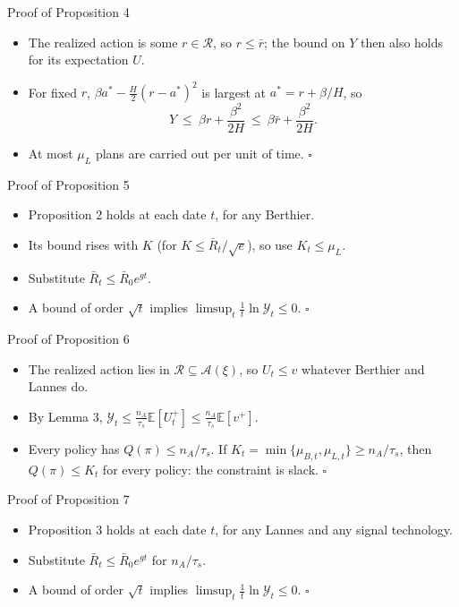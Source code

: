 \documentclass[aspectratio=169,11pt,t]{beamer}
\newcommand{\Lan}{\textcolor{lan}{Lannes}}
\newcommand{\E}{\mathbb{E}}
\newcommand{\Ycal}{\mathcal{Y}}
\begin{document}
\begin{frame}{Proof of Proposition 4}
  \begin{itemize}\setlength{\itemsep}{8pt}
    \item The realized action is some $r\in\mathcal{R}$, so $r\le\bar r$; the bound on $Y$ then also holds for its expectation $U$.
    \item For fixed $r$, $\beta a^*-\tfrac H2(r-a^*)^2$ is largest at $a^*=r+\beta/H$, so
    \[Y\ \le\ \beta r+\frac{\beta^2}{2H}\ \le\ \beta\bar r+\frac{\beta^2}{2H}.\]
    \item At most $\mu_L$ plans are carried out per unit of time. \hfill$\square$
  \end{itemize}
\end{frame}

\begin{frame}{Proof of Proposition 5}
  \begin{itemize}\setlength{\itemsep}{8pt}
    \item Proposition 2 holds at each date $t$, for any Berthier.
    \item Its bound rises with $K$ (for $K\le\bar R_t/\sqrt e$), so use $K_t\le\mu_L$.
    \item Substitute $\bar R_t\le\bar R_0e^{gt}$.
    \item A bound of order $\sqrt t$ implies $\limsup_t\tfrac1t\ln\Ycal_t\le0$. \hfill$\square$
  \end{itemize}
\end{frame}

\begin{frame}{Proof of Proposition 6}
  \begin{itemize}\setlength{\itemsep}{8pt}
    \item The realized action lies in $\mathcal{R}\subseteq\mathcal{A}(\xi)$, so $U_t\le v$ whatever Berthier and Lannes do.
    \item By Lemma 3, $\Ycal_t\le\frac{n_A}{\tau_s}\E[U_t^+]\le\frac{n_A}{\tau_s}\E[v^+]$.
    \item Every policy has $Q(\pi)\le n_A/\tau_s$. If $K_t=\min\{\mu_{B,t},\mu_{L,t}\}\ge n_A/\tau_s$, then $Q(\pi)\le K_t$ for every policy: the constraint is slack. \hfill$\square$
  \end{itemize}
\end{frame}

\begin{frame}{Proof of Proposition 7}
  \begin{itemize}\setlength{\itemsep}{8pt}
    \item Proposition 3 holds at each date $t$, for any \Lan{} and any signal technology.
    \item Substitute $\bar R_t\le\bar R_0e^{gt}$ for $n_A/\tau_s$.
    \item A bound of order $\sqrt t$ implies $\limsup_t\tfrac1t\ln\Ycal_t\le0$. \hfill$\square$
  \end{itemize}
\end{frame}
\end{document}
